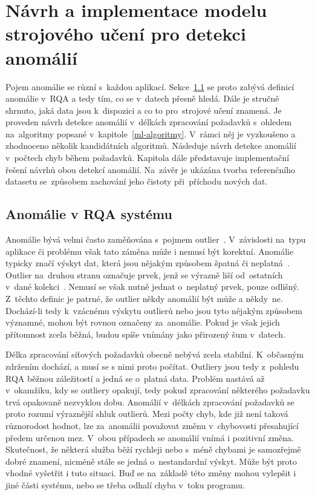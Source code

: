 \chapter{Návrh a implementace modelu strojového učení pro detekci anomálií}
\label{navrh-ai}

Pojem anomálie se různí s~každou aplikací. Sekce~\ref{anomalie-v-rqa} se proto zabývá definicí anomálie v~RQA a tedy tím, co se v~datech přesně hledá. Dále je stručně shrnuto, jaká data jsou k~dispozici a co to pro~strojové učení znamená. Je proveden návrh detekce anomálií v~délkách zpracování požadavků s~ohledem na~algoritmy popsané v~kapitole~\ref{ml-algoritmy}. V~rámci něj je vyzkoušeno a zhodnoceno několik kandidátních algoritmů. Následuje návrh detekce anomálií v~počtech chyb během požadavků. Kapitola dále představuje implementační řešení návrhů obou detekcí anomálií. Na~závěr je ukázána tvorba referenčního datasetu se~způsobem zachování jeho čistoty při~příchodu nových dat.

\section{Anomálie v RQA systému}
\label{anomalie-v-rqa}
Anomálie bývá velmi často zaměňována s~pojmem outlier~\cite{anomaly-vs-outlier-book, anomaly-vs-outlier-post}. V~závislosti na~typu aplikace či problému však tato záměna může i nemusí být korektní. Anomálie typicky značí výskyt dat, která jsou nějakým způsobem špatná či neplatná~\cite{anomaly-vs-outlier-post}. Outlier na~druhou stranu označuje prvek, jenž se výrazně liší od~ostatních v~dané kolekci~\cite{anomaly-vs-outlier-post}. Nemusí se však nutně jednat o~neplatný prvek, pouze odlišný. Z~těchto definic je patrné, že outlier někdy anomálií být může a někdy~ne. Dochází-li tedy k~vzácnému výskytu outlierů nebo jsou tyto nějakým způsobem významné, mohou být rovnou označeny za~anomálie. Pokud je však jejich přítomnost zcela běžná, budou spíše vnímány jako přirozený šum v~datech.

Délka zpracování síťových požadavků obecně nebývá zcela stabilní. K~občasným zdržením dochází, a musí se s nimi proto počítat. Outliery jsou tedy z~pohledu RQA běžnou záležitostí a jedná se o~platná data. Problém nastává až v~okamžiku, kdy se outliery opakují, tedy pokud zpracování některého požadavku trvá opakovaně nezvyklou dobu. Anomálií v~délkách zpracování požadavků se proto rozumí výraznější shluk outlierů. Mezi počty chyb, kde již není taková různorodost hodnot, lze za~anomálii považovat změnu v~chybovosti přesahující předem určenou mez. V~obou případech se anomálií vnímá i pozitivní změna. Skutečnost, že některá služba běží rychleji nebo s~méně chybami je samozřejmě dobré znamení, nicméně stále se jedná o~nestandardní výskyt. Může být proto vhodné vyšetřit i tuto situaci. Buď se na~základě této změny mohou vylepšit i jiné části systému, nebo se třeba odhalí chyba v~toku programu.


